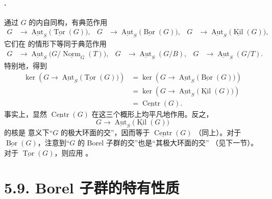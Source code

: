 \paragraph{.}
通过 \(G\) 的内自同构，有典范作用
\[
\begin{aligned}
  G&\longrightarrow
  \underline{\operatorname{Aut}}_S
  \bigl(\underline{\operatorname{Tor}}(G)\bigr),
  &
  G&\longrightarrow
  \underline{\operatorname{Aut}}_S
  \bigl(\underline{\operatorname{Bor}}(G)\bigr),
  &
  G&\longrightarrow
  \underline{\operatorname{Aut}}_S
  \bigl(\underline{\operatorname{Kil}}(G)\bigr),
\end{aligned}
\]
它们在 \textup{} 的情形下等同于典范作用
\[
\begin{aligned}
  G&\longrightarrow
  \underline{\operatorname{Aut}}_S
  \bigl(G/\underline{\operatorname{Norm}}_G(T)\bigr),
  &
  G&\longrightarrow
  \underline{\operatorname{Aut}}_S(G/B),
  &
  G&\longrightarrow
  \underline{\operatorname{Aut}}_S(G/T).
\end{aligned}
\]
特别地，得到
\[
\begin{aligned}
  \ker\!\left(
    G\longrightarrow
    \underline{\operatorname{Aut}}_S
    \bigl(\underline{\operatorname{Tor}}(G)\bigr)
  \right)
  &=
  \ker\!\left(
    G\longrightarrow
    \underline{\operatorname{Aut}}_S
    \bigl(\underline{\operatorname{Bor}}(G)\bigr)
  \right)\\
  &=
  \ker\!\left(
    G\longrightarrow
    \underline{\operatorname{Aut}}_S
    \bigl(\underline{\operatorname{Kil}}(G)\bigr)
  \right)\\
  &=
  \underline{\operatorname{Centr}}(G).
\end{aligned}
\]
事实上，显然 \(\underline{\operatorname{Centr}}(G)\) 在这三个概形上均平凡地作用。反之，
\[
  G\longrightarrow
  \underline{\operatorname{Aut}}_S
  \bigl(\underline{\operatorname{Kil}}(G)\bigr)
\]
的核是  意义下“\(G\) 的极大环面的交”，因而等于 \(\underline{\operatorname{Centr}}(G)\) \textup{（同上）}。对于 \(\underline{\operatorname{Bor}}(G)\)，注意到“\(G\) 的 Borel 子群的交”也是“其极大环面的交” \textup{（见下一节）}。对于 \(\underline{\operatorname{Tor}}(G)\)，则应用 。

\section*{5.9. Borel 子群的特有性质}


